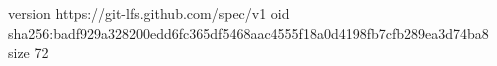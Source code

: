 version https://git-lfs.github.com/spec/v1
oid sha256:badf929a328200edd6fc365df5468aac4555f18a0d4198fb7cfb289ea3d74ba8
size 72
